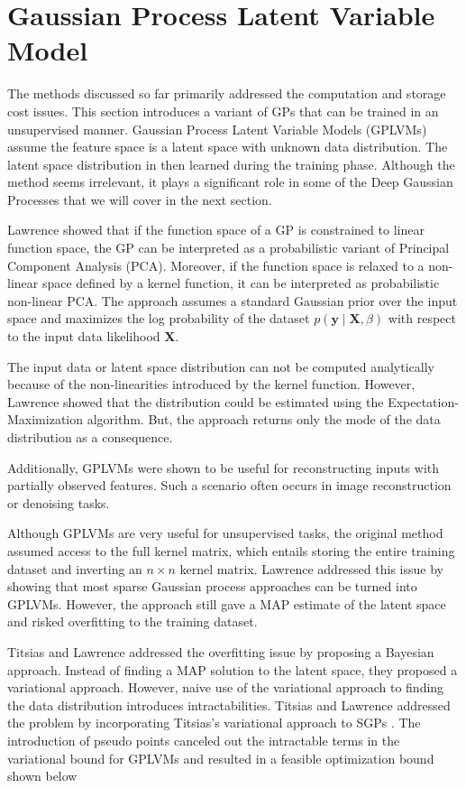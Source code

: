 \documentclass[letterpaper,11pt]{extarticle}
\begin{document}
\section{Gaussian Process Latent Variable Model}
The methods discussed so far primarily addressed the computation and storage cost issues. This section introduces a variant of GPs that can be trained in an unsupervised manner. Gaussian Process Latent Variable Models (GPLVMs)  \cite{Lawrence04,Lawrence05} assume the feature space is a latent space with unknown data distribution. The latent space distribution in then learned during the training phase. Although the method seems irrelevant, it plays a significant role in some of the Deep Gaussian Processes that we will cover in the next section.  

Lawrence \cite{Lawrence04,Lawrence05} showed that if the function space of a GP is constrained to linear function space, the GP can be interpreted as a probabilistic variant of Principal Component Analysis (PCA). Moreover, if the function space is relaxed to a non-linear space defined by a kernel function, it can be interpreted as probabilistic non-linear PCA. The approach assumes a standard Gaussian prior over the input space and maximizes the log probability of the dataset $p( \mathbf{y} \mid \mathbf{X}, \beta)$ with respect to the input data likelihood $\mathbf{X}$. 

The input data or latent space distribution can not be computed analytically because of the non-linearities introduced by the kernel function. However, Lawrence \cite{Lawrence04, Lawrence05} showed that the distribution could be estimated using the Expectation-Maximization algorithm. But, the approach returns only the mode of the data distribution as a consequence.

Additionally, GPLVMs were shown to be useful for reconstructing inputs with partially observed features. Such a scenario often occurs in image reconstruction or denoising tasks.

Although GPLVMs are very useful for unsupervised tasks, the original method assumed access to the full kernel matrix, which entails storing the entire training dataset and inverting an $n \times n$ kernel matrix. Lawrence \cite{Lawrence07} addressed this issue by showing that most sparse Gaussian process approaches can be turned into GPLVMs. However, the approach still gave a MAP estimate of the latent space and risked overfitting to the training dataset. 

Titsias and Lawrence \cite{TitsiasL10} addressed the overfitting issue by proposing a Bayesian approach. Instead of finding a MAP solution to the latent space, they proposed a variational approach. However, naive use of the variational approach to finding the data distribution introduces intractabilities. Titsias and Lawrence addressed the problem by incorporating Titsias's variational approach to SGPs \cite{Titsias09}. The introduction of pseudo points \cite{Titsias09} canceled out the intractable terms in the variational bound for GPLVMs and resulted in a feasible optimization bound shown below 
\end{document}
